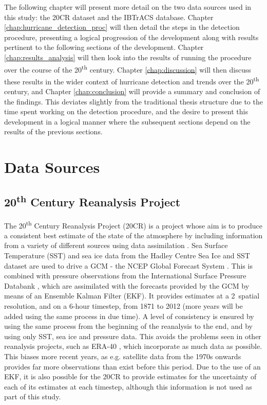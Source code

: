 \documentclass[pdftex,12pt,a4paper]{report}
\newcommand{\ts}{\textsuperscript}
\begin{document}
The following chapter will present more detail on the two data sources used in this study: the 20CR
dataset and the IBTrACS database. Chapter \ref{chap:hurricane_detection_proc} will then detail the
steps in the detection procedure, presenting a logical progression of the development along with
results pertinent to the following sections of the development. Chapter \ref{chap:results_analysis}
will then look into the results of running the procedure over the course of the 20\ts{th} century.
Chapter \ref{chap:discussion} will then discuss these results in the wider context of hurricane
detection and trends over the 20\ts{th} century, and Chapter \ref{chap:conclusion} will provide a
summary and conclusion of the findings. This deviates slightly from the traditional thesis structure
due to the time spent working on the detection procedure, and the desire to present this development
in a logical manner where the subsequent sections depend on the results of the previous sections.

\chapter{Data Sources}

\section{20\ts{th} Century Reanalysis Project}
\label{sec:20crp}

The 20\ts{th} Century Reanalysis Project (20CR) is a project whose aim is to produce a consistent
best estimate of the state of the atmosphere by including information from a variety of different
sources using data assimilation \parencite{compoTwentieth2011}. Sea Surface Temperature (SST) and
sea ice data from the Hadley Centre Sea Ice and SST dataset \parencite{rayner2003global} are used to drive
a GCM - the NCEP Global Forecast System \parencite{kanamitsu1989description, kanamitsu1991recent}.
This is combined with pressure observations from the International Surface Pressure Databank
\parencite{yin2008international}, which are assimilated with the forecasts provided by the GCM by
means of an Ensemble Kalman Filter (EKF). It provides estimates at a 2\textdegree\ spatial
resolution, and on a 6-hour timestep, from 1871 to 2012 (more years will be added using the same
process in due time). A level of consistency is ensured by using the same process from the beginning
of the reanalysis to the end, and by using only SST, sea ice and pressure data. This avoids the
problems seen in other reanalysis projects, such as ERA-40 \parencite{uppala2005era}, which
incorporate as much data as possible. This biases more recent years, as e.g. satellite data from the
1970s onwards provides far more observations than exist before this period. Due to the use of an
EKF, it is also possible for the 20CR to provide estimates for the uncertainty of each of its
estimates at each timestep, although this information is not used as part of this study.
\end{document}
